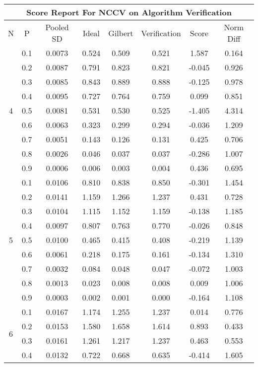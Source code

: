 \documentclass[11pt,a4paper]{report}
\begin{document}
\begin{longtable}{ | c | c || c | c | c | c | c | c | }
\hline
\multicolumn{8}{|c|}{ Score Report For NCCV on Algorithm Verification} \\
\hline
N & P & Pooled SD &  Ideal &  Gilbert & Verification  & Score & Norm Diff \\
 \hline
 \hline
 \endhead
\multirow{9}{*}{4} & 0.1 & 0.0073 & 0.524 & 0.509 & 0.521 & 1.587 & 0.164 \\
 & 0.2 & 0.0087 & 0.791 & 0.823 & 0.821 & -0.045 & 0.926 \\
 & 0.3 & 0.0085 & 0.843 & 0.889 & 0.888 & -0.125 & 0.978 \\
 & 0.4 & 0.0095 & 0.727 & 0.764 & 0.759 & 0.099 & 0.851 \\
 & 0.5 & 0.0081 & 0.531 & 0.530 & 0.525 & -1.405 & 4.314 \\
 & 0.6 & 0.0063 & 0.323 & 0.299 & 0.294 & -0.036 & 1.209 \\
 & 0.7 & 0.0051 & 0.143 & 0.126 & 0.131 & 0.425 & 0.706 \\
 & 0.8 & 0.0026 & 0.046 & 0.037 & 0.037 & -0.286 & 1.007 \\
 & 0.9 & 0.0006 & 0.006 & 0.003 & 0.004 & 0.436 & 0.695 \\
 \hline
\multirow{9}{*}{5} & 0.1 & 0.0106 & 0.810 & 0.838 & 0.850 & -0.301 & 1.454 \\
 & 0.2 & 0.0141 & 1.159 & 1.266 & 1.237 & 0.431 & 0.728 \\
 & 0.3 & 0.0104 & 1.115 & 1.152 & 1.159 & -0.138 & 1.185 \\
 & 0.4 & 0.0097 & 0.807 & 0.763 & 0.770 & -0.026 & 0.848 \\
 & 0.5 & 0.0100 & 0.465 & 0.415 & 0.408 & -0.219 & 1.139 \\
 & 0.6 & 0.0061 & 0.218 & 0.175 & 0.161 & -0.134 & 1.310 \\
 & 0.7 & 0.0032 & 0.084 & 0.048 & 0.047 & -0.072 & 1.003 \\
 & 0.8 & 0.0013 & 0.023 & 0.008 & 0.008 & 0.009 & 1.006 \\
 & 0.9 & 0.0003 & 0.002 & 0.001 & 0.000 & -0.164 & 1.108 \\
 \hline
\multirow{9}{*}{6} & 0.1 & 0.0167 & 1.174 & 1.255 & 1.237 & 0.014 & 0.776 \\
 & 0.2 & 0.0153 & 1.580 & 1.658 & 1.614 & 0.893 & 0.433 \\
 & 0.3 & 0.0161 & 1.261 & 1.217 & 1.237 & 0.463 & 0.553 \\
 & 0.4 & 0.0132 & 0.722 & 0.668 & 0.635 & -0.414 & 1.605 \\

\end{longtable}
\end{document}
